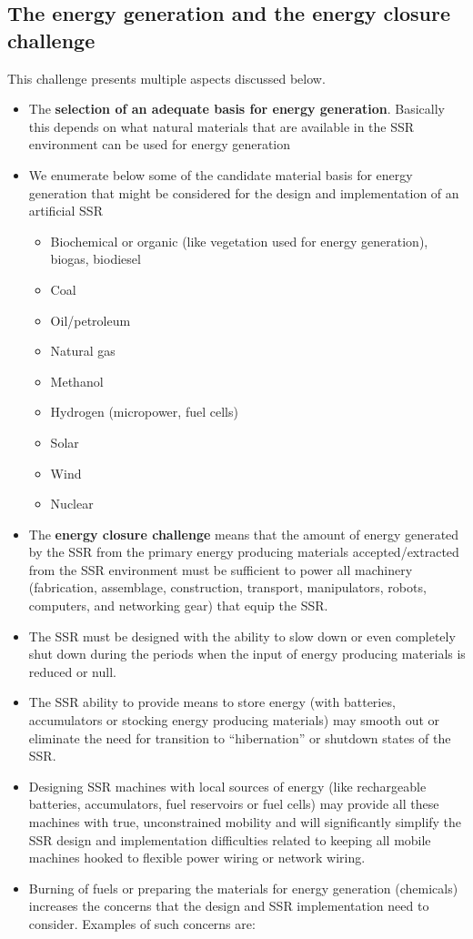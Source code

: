 \bigskip

\subsection[The energy generation and the energy closure challenge]{The
energy generation and the energy closure challenge}
\hypertarget{RefHeading3138306210128}{}This challenge presents multiple
aspects discussed below.


\bigskip

\begin{itemize}
\item The \textbf{selection of an adequate basis for energy generation}.
Basically this depends on what natural materials that are available in
the SSR environment can be used for energy generation
\item We enumerate below some of the candidate material basis for energy
generation that might be considered for the design and implementation
of an artificial SSR

\begin{itemize}
\item Biochemical or organic (like vegetation used for energy
generation), biogas, biodiesel
\item Coal
\item Oil/petroleum
\item Natural gas
\item Methanol
\item Hydrogen (micropower, fuel cells)
\item Solar
\item Wind
\item Nuclear
\end{itemize}
\item The \textbf{energy closure challenge} means that the amount of
energy generated by the SSR from the primary energy producing materials
accepted/extracted from the SSR environment must be sufficient to power
all machinery (fabrication, assemblage, construction, transport,
manipulators, robots, computers, and networking gear) that equip the
SSR.
\item The SSR must be designed with the ability to slow down or even
completely shut down during the periods when the input of energy
producing materials is reduced or null.
\item The SSR ability to provide means to store energy (with batteries,
accumulators or stocking energy producing materials) may smooth out or
eliminate the need for transition to “hibernation” or shutdown states
of the SSR.
\item Designing SSR machines with local sources of energy (like
rechargeable batteries, accumulators, fuel reservoirs or fuel cells)
may provide all these machines with true, unconstrained mobility and
will significantly simplify the SSR design and implementation
difficulties related to keeping all mobile machines hooked to flexible
power wiring or network wiring.
\item Burning of fuels or preparing the materials for energy generation
(chemicals) increases the concerns that the design and SSR
implementation need to consider. Examples of such concerns are: 


\end{itemize}
